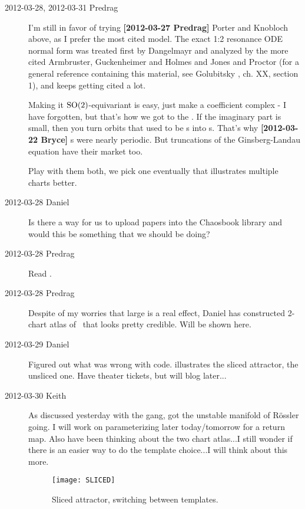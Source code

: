 \begin{description}
\item[2012-03-28, 2012-03-31 Predrag] I'm still in favor of trying {\bf
[2012-03-27 Predrag]} Porter and Knobloch above, as I prefer
the most cited model. The exact 1:2 resonance ODE normal form was
treated first by  Dangelmayr and analyzed by the more cited
Armbruster, Guckenheimer and Holmes and Jones and
Proctor (for a  general reference containing this material,
see Golubitsky \etal{}, ch. XX, section 1), and keeps getting
cited a lot.

Making it $\textrm{SO}(2)$-equivariant is easy, just make a coefficient complex
- I have forgotten, but that's how we got to the \cLe. If the imaginary
part is small, then you turn orbits that used to be \po s into \rpo s.
That's why {\bf [2012-03-22 Bryce]} \rpo s were nearly periodic. But
truncations of the Ginsberg-Landau equation have their market too.

Play with them both, we pick one eventually that illustrates multiple
charts better.

\item[2012-03-28 Daniel]
Is there a way for us to upload papers into the Chaosbook library and
would this be something that we should be doing?

\item[2012-03-28 Predrag] Read .

\item[2012-03-28 Predrag] Despite of my worries that
large {\phaseVel} is a real effect, Daniel has constructed 2-chart
atlas of \cLe\ that looks pretty credible. Will be shown here.

\item[2012-03-29 Daniel] Figured out what was wrong with code.
 illustrates the sliced attractor,
 the unsliced one. Have theater tickets, but will
blog later...

\item[2012-03-30 Keith] As discussed yesterday with the gang, got the
unstable manifold of R\"ossler going.  I will work on parameterizing later
today/tomorrow for a return map.  Also have been thinking about the two
chart atlas...I still wonder if there is an easier way to do the template
choice...I will think about this more.

\begin{figure}
\begin{center}
  \texttt{[image: SLICED]}
\end{center}
  \caption{
  Sliced attractor, switching between templates.}
\label{fig:sliced}
\end{figure}


\end{description}

